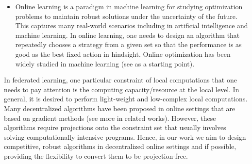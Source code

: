 \begin{itemize}
\item
Online learning is a paradigm in machine learning for studying optimization problems to maintain robust solutions under the uncertainty of the future.  
This captures many real-world scenarios including in artificial intelligence and machine learning. 
In online learning, one needs to design an algorithm that repeatedly chooses a strategy from a given set so that the performance is as good as the best fixed action in hindsight. 
Online optimization has been widely studied in machine learning (see \cite{Hazanothers16:Introduction-to-online} as a starting point). 
\end{itemize}



In federated learning, one particular constraint of local computations that one needs to pay attention is the computing capacity/resource at the local level.
In general, it is desired to perform light-weight and low-complex local computations.
Many decentralized algorithms have been proposed in online settings that are based on gradient methods (see more in related works). 
However, these algorithms require projections onto the constraint set that usually involves solving computationally intensive programs.
Hence, in our work we aim to design competitive, robust algorithms in decentralized online settings and if possible, providing the flexibility to convert them to be projection-free. 


